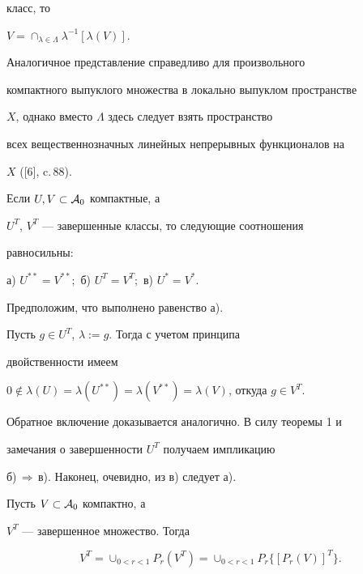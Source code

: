 класс, то 


$V = \cap_{\lambda \in \Lambda} \lambda^{-1} [\lambda(V)]$.


Аналогичное представление справедливо для произвольного 


компактного выпуклого множества в локально выпуклом пространстве 


$X$, однако вместо $\Lambda$ здесь следует взять пространство 


всех вещественнозначных линейных непрерывных функционалов на


$X$ ([6], c.\,88).





\begin{cor}


Если $U, V \subset {\cal A}_0$ компактные, а 


$U^T$, $V^T$ --- завершенные классы, то следующие соотношения 


равносильны:





а) $U^{**} = V^{**};$ б) $U^T = V^T;$ в) $U^{*} = V^{*}$.


\end{cor}





\begin{pf}


Предположим, что выполнено равенство а).


Пусть $g \in U^T$, $\lambda:= g$. Тогда с учетом принципа 


двойственности имеем 


$0 \notin \lambda(U)= \lambda(U^{**})= \lambda(V^{**})= 


\lambda(V)$, откуда $g\in V^T$. 


Обратное включение доказывается аналогично. В силу теоремы 1 и 


замечания о завершенности $U^T$ получаем импликацию 


б)\,$\Rightarrow$\,в). Наконец, очевидно, из в) следует а).


\end{pf}





\begin{thm}


Пусть $V\subset{\cal A}_0$ компактно, а 


$V^T$ --- завершенное множество. Тогда


\begin{equation}


V^T = \cup_{0<r<1} P_r (V^T)= 


\cup_{0<r<1} P_r \{ [P_r (V)]^T\}.


\end{equation}


\end{thm}






